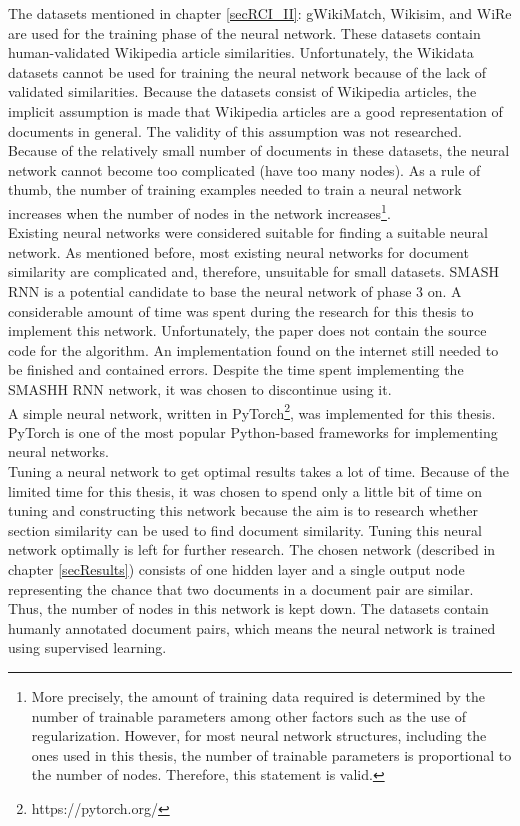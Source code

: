 The datasets mentioned in chapter \ref{secRCI_II}: gWikiMatch, Wikisim, and WiRe are used for the training phase of the neural network. These datasets contain human-validated Wikipedia article similarities. Unfortunately, the Wikidata datasets cannot be used for training the neural network because of the lack of validated similarities. Because the datasets consist of Wikipedia articles, the implicit assumption is made that Wikipedia articles are a good representation of documents in general. The validity of this assumption was not researched. Because of the relatively small number of documents in these datasets, the neural network cannot become too complicated (have too many nodes). As a rule of thumb, the number of training examples needed to train a neural network increases when the number of nodes in the network increases\footnote{More precisely, the amount of training data required is determined by the number of trainable parameters among other factors such as the use of regularization. However, for most neural network structures, including the ones used in this thesis, the number of trainable parameters is proportional to the number of nodes. Therefore, this statement is valid.}.\\

Existing neural networks were considered suitable for finding a suitable neural network. As mentioned before, most existing neural networks for document similarity are complicated and, therefore, unsuitable for small datasets. SMASH RNN \citep{jiang2019semantic} is a potential candidate to base the neural network of phase 3 on. A considerable amount of time was spent during the research for this thesis to implement this network. Unfortunately, the paper does not contain the source code for the algorithm. An implementation found on the internet still needed to be finished and contained errors. Despite the time spent implementing the SMASHH RNN network, it was chosen to discontinue using it.\\

A simple neural network, written in PyTorch\footnote{https://pytorch.org/}, was implemented for this thesis. PyTorch is one of the most popular Python-based frameworks for implementing neural networks.\\

Tuning a neural network to get optimal results takes a lot of time. Because of the limited time for this thesis, it was chosen to spend only a little bit of time on tuning and constructing this network because the aim is to research whether section similarity can be used to find document similarity. Tuning this neural network optimally is left for further research. The chosen network (described in chapter \ref{secResults}) consists of one hidden layer and a single output node representing the chance that two documents in a document pair are similar. Thus, the number of nodes in this network is kept down. The datasets contain humanly annotated document pairs, which means the neural network is trained using supervised learning. \\

